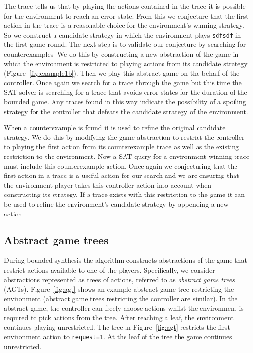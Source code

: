 The trace tells us that by playing the actions contained in the trace it is possible for the environment to reach an error state. From this we conjecture that the first action in the trace is a reasonable choice for the environment's winning strategy. So we construct a candidate strategy in which the environment plays \texttt{sdfsdf} in the first game round. The next step is to validate our conjecture by searching for counterexamples. We do this by constructing a new abstraction of the game in which the environment is restricted to playing actions from its candidate strategy (Figure~\ref{fig:example1b}). Then we play this abstract game on the behalf of the controller. Once again we search for a trace through the game but this time the SAT solver is searching for a trace that avoids error states for the duration of the bounded game. Any traces found in this way indicate the possibility of a spoiling strategy for the controller that defeats the candidate strategy of the environment.

When a counterexample is found it is used to refine the original candidate strategy. We do this by modifying the game abstraction to restrict the controller to playing the first action from its counterexample trace as well as the existing restriction to the environment. Now a SAT query for a environment winning trace must include this counterexample action. Once again we conjecturing that the first action in a trace is a useful action for our search and we are ensuring that the environment player takes this controller action into account when constructing its strategy. If a trace exists with this restriction to the game it can be used to refine the environment's candidate strategy by appending a new action.

\subsection{Abstract game trees}

During bounded synthesis the algorithm constructs abstractions of the game that restrict actions available to one of the players.  Specifically, we consider abstractions represented as trees of actions, referred to as \emph{abstract game trees} (AGTs).  Figure~\ref{fig:agt} shows an example abstract game tree restricting the environment (abstract game trees restricting the controller are similar).  In the abstract game, the controller can freely choose actions whilst the environment is required to pick actions from the tree.  After reaching a leaf, the environment continues playing unrestricted.  The tree in Figure~\ref{fig:agt} restricts the first environment action to \texttt{request=1}. At the leaf of the tree the game continues unrestricted.

